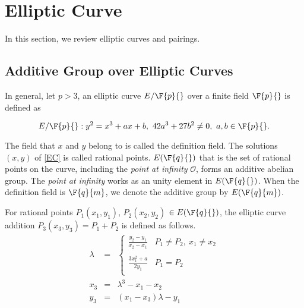 

\section{Elliptic Curve}
In this section, we review elliptic curves and pairings. 

\subsection{Additive Group over Elliptic Curves}

In general, let $p>3$, an elliptic curve $E/\F{p}{}$ over a finite field $\F{p}{}$ is defined as 

\begin{equation}
E/\F{p}{}: y^2=x^3+ax+b,\ 42a^3+27b^2 \neq 0,\ a,b\in \F{p}{}. \label{EC}
\end{equation}

The field that $x$ and $y$ belong to is called the definition field. 
The solutions $(x,y)$ of \eqref{EC} is called rational points.
$E(\F{q}{})$ that is the set of rational points on the curve, including the {\it point at infinity} $\mathcal{O}$, forms an additive abelian group. 
The {\it point at infinity} works as an unity element in $E(\F{q}{})$.
When the definition field is $\F{q}{m}$, we denote the additive group by $E(\F{q}{m})$.

For rational points $P_1(x_1,y_1)$, $P_2(x_2,y_2)$ $\in E(\F{q}{})$, the elliptic curve addition $P_3(x_3,y_3)=P_1+P_2$ is defined as follows.
\begin{eqnarray*}
\lambda &=& \left\{ \begin{array}{ll}
{\displaystyle \frac{y_2-y_1}{x_2-x_1}} & P_1\neq P_2,\ x_1\neq x_2 \\
& \\
{\displaystyle \frac{3x_1^2+a}{2y_1}} & P_1=P_2 \\

\end{array} \right.\\
x_3 &=& \lambda^3-x_1-x_2\\
y_3 &=& (x_1-x_3)\lambda-y_1
\end{eqnarray*} 

